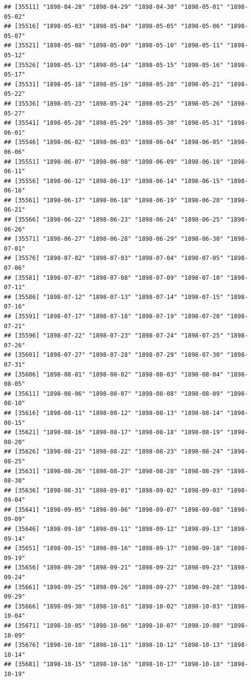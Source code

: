 \documentclass{article}\usepackage[]{graphicx}\usepackage[]{color}
\makeatletter
\newenvironment{kframe}{%
 \def\at@end@of@kframe{}%
 \ifinner\ifhmode%
  \def\at@end@of@kframe{\end{minipage}}%
  \begin{minipage}{\columnwidth}%
 \fi\fi%
 \def\FrameCommand##1{\hskip\@totalleftmargin \hskip-\fboxsep
 \colorbox{shadecolor}{##1}\hskip-\fboxsep
     \hskip-\linewidth \hskip-\@totalleftmargin \hskip\columnwidth}%
 \MakeFramed {\advance\hsize-\width
   \@totalleftmargin\z@ \linewidth\hsize
   \@setminipage}}%
 {\par\unskip\endMakeFramed%
 \at@end@of@kframe}
\newenvironment{knitrout}{}{} %
\makeatother
\begin{document}
\begin{description}
\begin{knitrout}
\begin{kframe}
\begin{verbatim}
## [35511] "1898-04-28" "1898-04-29" "1898-04-30" "1898-05-01" "1898-05-02"
## [35516] "1898-05-03" "1898-05-04" "1898-05-05" "1898-05-06" "1898-05-07"
## [35521] "1898-05-08" "1898-05-09" "1898-05-10" "1898-05-11" "1898-05-12"
## [35526] "1898-05-13" "1898-05-14" "1898-05-15" "1898-05-16" "1898-05-17"
## [35531] "1898-05-18" "1898-05-19" "1898-05-20" "1898-05-21" "1898-05-22"
## [35536] "1898-05-23" "1898-05-24" "1898-05-25" "1898-05-26" "1898-05-27"
## [35541] "1898-05-28" "1898-05-29" "1898-05-30" "1898-05-31" "1898-06-01"
## [35546] "1898-06-02" "1898-06-03" "1898-06-04" "1898-06-05" "1898-06-06"
## [35551] "1898-06-07" "1898-06-08" "1898-06-09" "1898-06-10" "1898-06-11"
## [35556] "1898-06-12" "1898-06-13" "1898-06-14" "1898-06-15" "1898-06-16"
## [35561] "1898-06-17" "1898-06-18" "1898-06-19" "1898-06-20" "1898-06-21"
## [35566] "1898-06-22" "1898-06-23" "1898-06-24" "1898-06-25" "1898-06-26"
## [35571] "1898-06-27" "1898-06-28" "1898-06-29" "1898-06-30" "1898-07-01"
## [35576] "1898-07-02" "1898-07-03" "1898-07-04" "1898-07-05" "1898-07-06"
## [35581] "1898-07-07" "1898-07-08" "1898-07-09" "1898-07-10" "1898-07-11"
## [35586] "1898-07-12" "1898-07-13" "1898-07-14" "1898-07-15" "1898-07-16"
## [35591] "1898-07-17" "1898-07-18" "1898-07-19" "1898-07-20" "1898-07-21"
## [35596] "1898-07-22" "1898-07-23" "1898-07-24" "1898-07-25" "1898-07-26"
## [35601] "1898-07-27" "1898-07-28" "1898-07-29" "1898-07-30" "1898-07-31"
## [35606] "1898-08-01" "1898-08-02" "1898-08-03" "1898-08-04" "1898-08-05"
## [35611] "1898-08-06" "1898-08-07" "1898-08-08" "1898-08-09" "1898-08-10"
## [35616] "1898-08-11" "1898-08-12" "1898-08-13" "1898-08-14" "1898-08-15"
## [35621] "1898-08-16" "1898-08-17" "1898-08-18" "1898-08-19" "1898-08-20"
## [35626] "1898-08-21" "1898-08-22" "1898-08-23" "1898-08-24" "1898-08-25"
## [35631] "1898-08-26" "1898-08-27" "1898-08-28" "1898-08-29" "1898-08-30"
## [35636] "1898-08-31" "1898-09-01" "1898-09-02" "1898-09-03" "1898-09-04"
## [35641] "1898-09-05" "1898-09-06" "1898-09-07" "1898-09-08" "1898-09-09"
## [35646] "1898-09-10" "1898-09-11" "1898-09-12" "1898-09-13" "1898-09-14"
## [35651] "1898-09-15" "1898-09-16" "1898-09-17" "1898-09-18" "1898-09-19"
## [35656] "1898-09-20" "1898-09-21" "1898-09-22" "1898-09-23" "1898-09-24"
## [35661] "1898-09-25" "1898-09-26" "1898-09-27" "1898-09-28" "1898-09-29"
## [35666] "1898-09-30" "1898-10-01" "1898-10-02" "1898-10-03" "1898-10-04"
## [35671] "1898-10-05" "1898-10-06" "1898-10-07" "1898-10-08" "1898-10-09"
## [35676] "1898-10-10" "1898-10-11" "1898-10-12" "1898-10-13" "1898-10-14"
## [35681] "1898-10-15" "1898-10-16" "1898-10-17" "1898-10-18" "1898-10-19"

\end{verbatim}
\end{kframe}
\end{knitrout}
\end{description}
\end{document}
